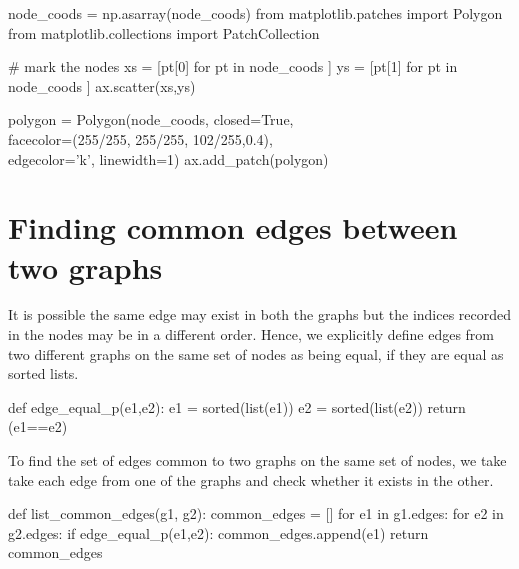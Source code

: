 node_coods = np.asarray(node_coods)
from matplotlib.patches import Polygon
from matplotlib.collections import PatchCollection

# mark the nodes
xs = [pt[0] for pt in node_coods ]
ys = [pt[1] for pt in node_coods ]
ax.scatter(xs,ys)

polygon = Polygon(node_coods, closed=True, \\
                  facecolor=(255/255, 255/255, 102/255,0.4), \\
                  edgecolor='k', linewidth=1)
ax.add_patch(polygon)

\nwendcode{}\nwdocspar



\section{Finding common edges between two graphs}


It is possible the same edge may exist in both the graphs
but the indices recorded in the nodes may be in a different order. 
Hence, we explicitly define edges from two different graphs on the same set of nodes
as being equal, if they are equal as sorted lists.

\nwenddocs{}\endmoddef\nwstartdeflinemarkup{}\nwenddeflinemarkup
def edge_equal_p(e1,e2):
     e1 = sorted(list(e1))
     e2 = sorted(list(e2))
     return (e1==e2)
\nwendcode{}\nwdocspar

To find the set of edges common to two graphs on the same set of nodes, we take take each
edge from one of the graphs and check whether it exists in the other. 


\nwenddocs{}\plusendmoddef\nwstartdeflinemarkup{}\nwenddeflinemarkup
def list_common_edges(g1, g2):
     common_edges = []
     for e1 in g1.edges:
          for e2 in g2.edges:
             if  edge_equal_p(e1,e2):
                  common_edges.append(e1)
     return common_edges
\nwendcode{}\nwdocspar

